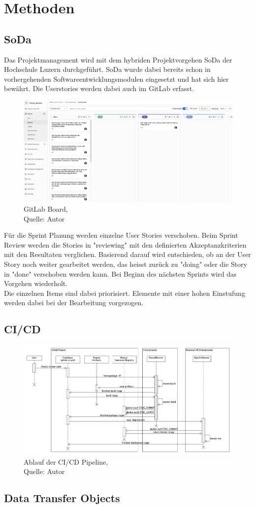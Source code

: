 \section{Methoden}
\subsection{\gls{SoDa}}
Das Projektmanagement wird mit dem hybriden Projektvorgehen \gls{SoDa} der Hochschule Luzern durchgeführt. 
SoDa wurde dabei bereits schon in vorhergehenden Softwareentwicklungsmodulen eingesetzt und hat sich hier bewährt. Die Userstories werden dabei auch im \gls{GitLab} erfasst.  
\begin{figure}[H]
	\centering
	\includegraphics[width=1\textwidth]{images/boardGitlab.png}
	\caption[GitLab Board]{GitLab Board,\\ Quelle: Autor}
	\label{img: GitlLabBoard}
\end{figure}
Für die Sprint Planung werden einzelne User Stories verschoben. Beim Sprint Review werden die Stories in "reviewing" mit den definierten Akzeptanzkriterien mit den Resultaten verglichen. Basierend darauf wird entschieden, ob an der \gls{User Story} noch weiter gearbeitet werden, das heisst zurück zu "doing" oder die Story in "done" verschoben werden kann. Bei Beginn des nächsten Sprints wird das Vorgehen wiederholt. \\
Die einzelnen Items sind dabei priorisiert. Elemente mit einer hohen Einstufung werden dabei bei der Bearbeitung vorgezogen. 

\subsection{CI/CD}
\begin{figure}[H]
	\centering
	\includegraphics[width=1\textwidth]{images/sequenceCicd.png}
	\caption[Ablauf der CI/CD Pipeline]{Ablauf der CI/CD Pipeline,\\ Quelle: Autor}
	\label{img: cicdPipeline}
\end{figure}

\subsection{Data Transfer Objects}\label{DTO}
\newpage